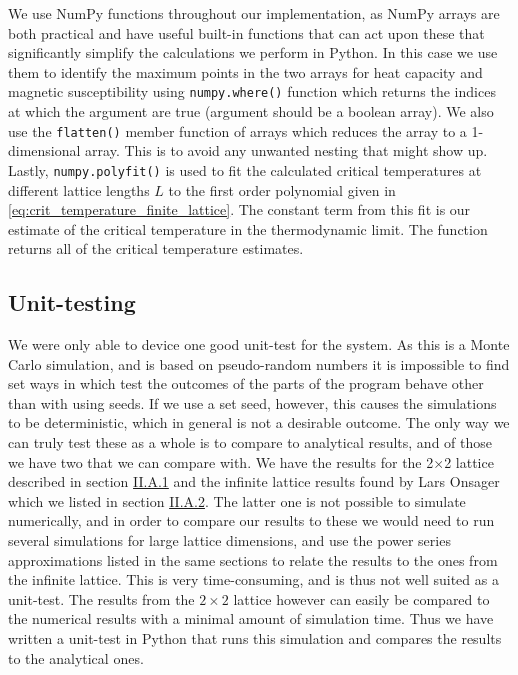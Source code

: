 \documentclass[reprint,english,notitlepage]{revtex4-1}  %
\begin{document}
We use NumPy \citep{numpy} functions throughout our implementation, as NumPy arrays are both practical and have useful built-in functions that can act upon these that significantly simplify the calculations we perform in Python. In this case we use them to identify the maximum points in the two arrays for heat capacity and magnetic susceptibility using \verb+numpy.where()+ function which returns the indices at which the argument are true (argument should be a boolean array). We also use the \verb+flatten()+ member function of arrays which reduces the array to a 1-dimensional array. This is to avoid any unwanted nesting that might show up. Lastly, \verb+numpy.polyfit()+ is used to fit the calculated critical temperatures at different lattice lengths $L$ to the first order polynomial given in \eqref{eq:crit_temperature_finite_lattice}. The constant term from this fit is our estimate of the critical temperature in the thermodynamic limit. The function returns all of the critical temperature estimates.


\subsection{Unit-testing} \label{sec:III:B}

We were only able to device one good unit-test for the system. As this is a Monte Carlo simulation, and is based on pseudo-random numbers it is impossible to find set ways in which test the outcomes of the parts of the program behave other than with using seeds. If we use a set seed, however, this causes the simulations to be deterministic, which in general is not a desirable outcome. The only way we can truly test these as a whole is to compare to analytical results, and of those we have two that we can compare with. We have the results for the 2$\times$2 lattice described in section \hyperref[sec:II.A.i]{II.A.1} and the infinite lattice results found by Lars Onsager \citep{L.Onsager1944} which we listed in section \hyperref[sec:II.A.ii]{II.A.2}. The latter one is not possible to simulate numerically, and in order to compare our results to these we would need to run several simulations for large lattice dimensions, and use the power series approximations listed in the same sections to relate the results to the ones from the infinite lattice. This is very time-consuming, and is thus not well suited as a unit-test. The results from the $2\times2$ lattice however can easily be compared to the numerical results with a minimal amount of simulation time. Thus we have written a unit-test in Python that runs this simulation and compares the results to the analytical ones.     
\end{document}
